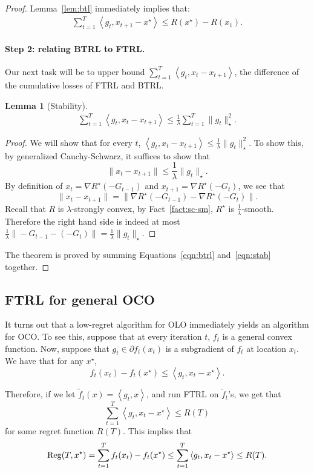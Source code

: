 \documentclass{article}
\newtheorem{lemma}{Lemma}
\DeclareMathOperator*{\Reg}{{\rm Reg}}
\newcommand{\inner}[2]{\left\langle #1,#2 \right\rangle}
\begin{document}
\begin{proof}
Lemma~\ref{lem:btl} immediately implies that:
\begin{eqnarray}
  \sum_{t=1}^T \inner{g_t}{x_{t+1} - x^\star} \leq R(x^\star) - R(x_1).
  \label{eqn:btrl}
\end{eqnarray}


\paragraph{Step 2: relating BTRL to FTRL.} Our next task will be to upper bound $\sum_{t=1}^T \inner{g_t}{x_{t} - x_{t+1}}$, the difference of the cumulative losses of FTRL and BTRL.

\begin{lemma}[Stability]
\begin{eqnarray}
  \sum_{t=1}^T \inner{g_t}{x_{t} - x_{t+1}} \leq \frac1 \lambda \sum_{t=1}^T \| g_t \|_\star^2.
  \label{eqn:stab}
\end{eqnarray}
\end{lemma}
\begin{proof}
We will show that for every $t$, $\inner{g_t}{x_{t} - x_{t+1}} \leq \frac1\lambda \| g_t \|_\star^2$. To show this, by generalized Cauchy-Schwarz, it suffices to show that
\[ \| x_t - x_{t+1} \| \leq \frac1\lambda \| g_t \|_\star. \]
By definition of $x_t = \nabla R^\star(-G_{t-1})$ and $x_{t+1} = \nabla R^\star(-G_t)$, we see that
\[ \| x_t - x_{t+1} \| = \| \nabla R^\star(-G_{t-1}) - \nabla R^\star(-G_t) \|. \]
Recall that $R$ is $\lambda$-strongly convex, by Fact~\ref{fact:sc-sm}, $R^\star$ is $\frac1\lambda$-smooth. Therefore the right hand side is indeed at most
$\frac1\lambda \| -G_{t-1} - (-G_t)\| = \frac1\lambda \| g_t \|_\star$.
\end{proof}

The theorem is proved by summing Equations~\eqref{eqn:btrl} and~\eqref{eqn:stab} together.
\end{proof}

\subsection{FTRL for general OCO}
It turns out that a low-regret algorithm for OLO immediately yields an algorithm for OCO.
To see this, suppose that at every iteration $t$, $f_t$ is a general convex function.
Now, suppose that $g_t \in \partial f_t(x_t)$ is a subgradient of $f_t$ at location $x_t$.
We have that for any $x^\star$,
\[ f_t(x_t) - f_t(x^\star) \leq \inner{g_t}{x_t - x^\star}. \]

Therefore, if we let $\tilde{f}_t(x) = \inner{g_t}{x}$, and run FTRL on $\tilde{f}_t$'s, we get that
\[ \sum_{t=1}^T \inner{g_t}{x_t - x^\star} \leq R(T) \]
for some regret function $R(T)$. This implies that
\[ \Reg(T, x^\star) = \sum_{t=1}^T f_t(x_t) - f_t(x^\star) \leq \sum_{t=1}^T \inner{g_t}{x_t - x^\star} \leq R(T). \]
\end{document}
